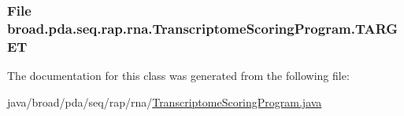 \hypertarget{classbroad_1_1pda_1_1seq_1_1rap_1_1rna_1_1_transcriptome_scoring_program_a00f43c9c9e8e2762acfc1517b87d8608}{
\subsubsection[{T\+A\+R\+G\+E\+T}]{\setlength{\rightskip}{0pt plus 5cm}File broad.\+pda.\+seq.\+rap.\+rna.\+Transcriptome\+Scoring\+Program.\+T\+A\+R\+G\+E\+T}}\label{classbroad_1_1pda_1_1seq_1_1rap_1_1rna_1_1_transcriptome_scoring_program_a00f43c9c9e8e2762acfc1517b87d8608}


The documentation for this class was generated from the following file\+:\begin{DoxyCompactItemize}
\item 
java/broad/pda/seq/rap/rna/\hyperlink{_transcriptome_scoring_program_8java}{Transcriptome\+Scoring\+Program.\+java}\end{DoxyCompactItemize}
